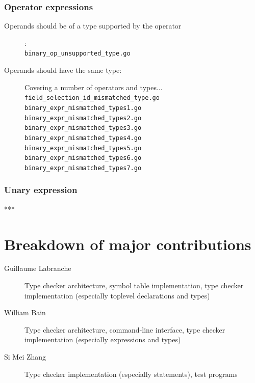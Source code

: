 \documentclass[oneside]{article}
\begin{document}
\subsubsection{Operator expressions}
\begin{description}
  \item[Operands should be of a type supported by the operator]: \\
    \verb|binary_op_unsupported_type.go|
  \item[Operands should have the same type:] Covering a number of operators and types...\\
    \verb|field_selection_id_mismatched_type.go|\\
    \verb|binary_expr_mismatched_types1.go|\\
    \verb|binary_expr_mismatched_types2.go|\\
    \verb|binary_expr_mismatched_types3.go|\\
    \verb|binary_expr_mismatched_types4.go|\\
    \verb|binary_expr_mismatched_types5.go|\\
    \verb|binary_expr_mismatched_types6.go|\\
    \verb|binary_expr_mismatched_types7.go|
\end{description}


\subsubsection{Unary expression}
***

\section{Breakdown of major contributions}

\begin{description}
    \item[Guillaume Labranche] Type checker architecture, symbol table implementation, type checker implementation (especially toplevel declarations and types)
    \item[William Bain] Type checker architecture, command-line interface, type checker implementation (especially expressions and types)
    \item[Si Mei Zhang] Type checker implementation (especially statements), test programs
\end{description}
\end{document}
